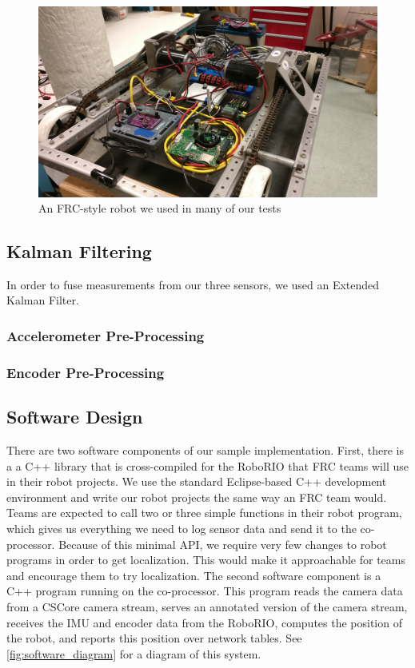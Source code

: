 \documentclass{article}
\begin{document}
    \begin{figure}[H]
      \centering
      \includegraphics[width=1\linewidth]{./images/mocap_robot.jpg}
      \caption{An FRC-style robot we used in many of our tests}
      \label{fig:mocap_robot}
    \end{figure}

	\subsection{Kalman Filtering}

    In order to fuse measurements from our three sensors, we used an Extended Kalman Filter.

    \subsubsection{Accelerometer Pre-Processing}
    \subsubsection{Encoder Pre-Processing}

  \subsection{Software Design}

    There are two software components of our sample implementation. First, there is a a C++ library that is cross-compiled for the RoboRIO that FRC teams will use in their robot projects. We use the standard Eclipse-based C++ development environment and write our robot projects the same way an FRC team would. Teams are expected to call two or three simple functions in their robot program, which gives us everything we need to log sensor data and send it to the co-processor. Because of this minimal API, we require very few changes to robot programs in order to get localization. This would make it approachable for teams and encourage them to try localization. The second software component is a C++ program running on the co-processor. This program reads the camera data from a CSCore camera stream, serves an annotated version of the camera stream, receives the IMU and encoder data from the RoboRIO, computes the position of the robot, and reports this position over network tables. See \ref{fig:software_diagram} for a diagram of this system.
\end{document}
